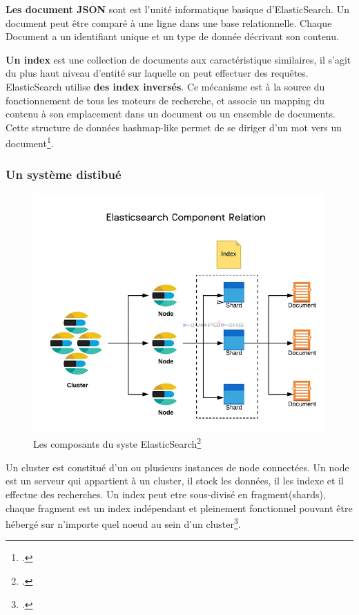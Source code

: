 \documentclass{article}
\begin{document}
\textbf{Les document JSON} sont est l'unité informatique basique d'ElasticSearch. Un document peut être comparé à une ligne dans une base relationnelle.
Chaque Document a un identifiant unique et un type de donnée décrivant son contenu. 

\textbf{Un index} est une collection de documents aux caractéristique similaires, il s'agit du plus haut niveau d'entité sur laquelle on peut effectuer des requêtes. ElasticSearch   
utilise \textbf{des index inversés}. Ce mécanisme est à la source du fonctionnement de tous les moteurs de recherche, et associe un mapping du contenu à son emplacement dans 
un document ou un ensemble de documents. Cette structure de données hashmap-like permet de se diriger d’un mot vers un document\footcite{Gopalakrishnan23}. 

\subsubsection{Un système distibué}

\begin{figure}[h]
   \begin{center}
   \includegraphics[width=\textwidth]{Elasticsearch-component-relation.png}
   \caption{Les composants du syste ElasticSearch\footcite{DevopsIdeas22}}
   \end{center}
   \label{explicationsimplerag}
\end{figure}

Un cluster est constitué d'un ou plusieurs instances de node connectées.
Un node est un serveur qui appartient à un cluster, il stock les données, il les indexe et il effectue des recherches.
Un index peut etre sous-divisé en fragment(shards), chaque fragment est un index indépendant et pleinement fonctionnel 
pouvant être hébergé sur n’importe quel noeud au sein d’un cluster\footcite{Gopalakrishnan23}.


\newpage

\printbibliography

\listoffigures
\end{document}
